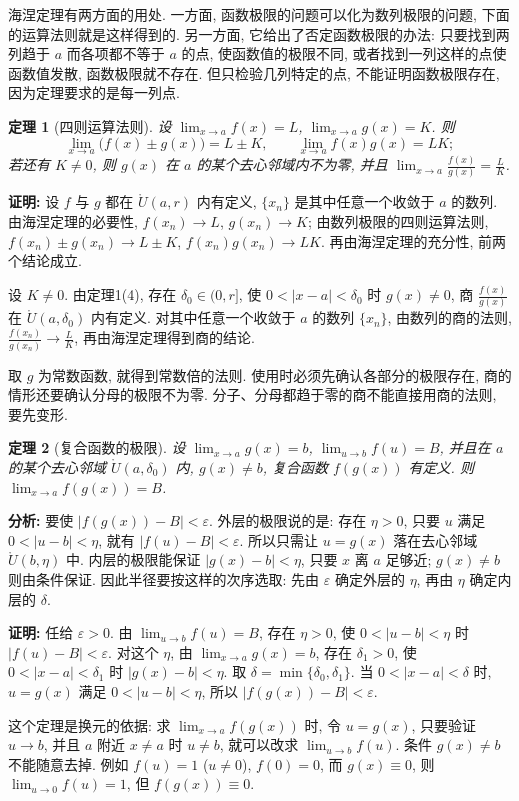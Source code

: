 \documentclass[UTF8,openany]{ctexbook}
\theoremstyle{chinesetextbook}
\newtheorem{theorem}{定理}[section]
\newenvironment{cnproof}{\par\indent\textbf{证明:} \ignorespaces}{\par}
\begin{document}
海涅定理有两方面的用处. 一方面, 函数极限的问题可以化为数列极限的问题, 下面的运算法则就是这样得到的. 另一方面, 它给出了否定函数极限的办法: 只要找到两列趋于 $a$ 而各项都不等于 $a$ 的点, 使函数值的极限不同, 或者找到一列这样的点使函数值发散, 函数极限就不存在. 但只检验几列特定的点, 不能证明函数极限存在, 因为定理要求的是每一列点.
\begin{theorem}[四则运算法则]
设 $\displaystyle\lim_{x\to a}f(x)=L$, $\displaystyle\lim_{x\to a}g(x)=K$. 则
\[
\lim_{x\to a}\bigl(f(x)\pm g(x)\bigr)=L\pm K,\qquad\lim_{x\to a}f(x)g(x)=LK;
\]
若还有 $K\ne0$, 则 $g(x)$ 在 $a$ 的某个去心邻域内不为零, 并且 $\displaystyle\lim_{x\to a}\frac{f(x)}{g(x)}=\frac LK$.
\end{theorem}
\begin{cnproof}
设 $f$ 与 $g$ 都在 $\mathring U(a,r)$ 内有定义, $\{x_n\}$ 是其中任意一个收敛于 $a$ 的数列. 由海涅定理的必要性, $f(x_n)\to L$, $g(x_n)\to K$; 由数列极限的四则运算法则, $f(x_n)\pm g(x_n)\to L\pm K$, $f(x_n)g(x_n)\to LK$. 再由海涅定理的充分性, 前两个结论成立.

设 $K\ne0$. 由定理1(4), 存在 $\delta_0\in(0,r]$, 使 $0<|x-a|<\delta_0$ 时 $g(x)\ne0$, 商 $\displaystyle\frac{f(x)}{g(x)}$ 在 $\mathring U(a,\delta_0)$ 内有定义. 对其中任意一个收敛于 $a$ 的数列 $\{x_n\}$, 由数列的商的法则, $\displaystyle\frac{f(x_n)}{g(x_n)}\to\frac LK$, 再由海涅定理得到商的结论.
\end{cnproof}
取 $g$ 为常数函数, 就得到常数倍的法则. 使用时必须先确认各部分的极限存在, 商的情形还要确认分母的极限不为零. 分子、分母都趋于零的商不能直接用商的法则, 要先变形.
\begin{theorem}[复合函数的极限]
设 $\displaystyle\lim_{x\to a}g(x)=b$, $\displaystyle\lim_{u\to b}f(u)=B$, 并且在 $a$ 的某个去心邻域 $\mathring U(a,\delta_0)$ 内, $g(x)\ne b$, 复合函数 $f(g(x))$ 有定义. 则 $\displaystyle\lim_{x\to a}f(g(x))=B$.
\end{theorem}
\par\indent\textbf{分析:} 要使 $|f(g(x))-B|<\varepsilon$. 外层的极限说的是: 存在 $\eta>0$, 只要 $u$ 满足 $0<|u-b|<\eta$, 就有 $|f(u)-B|<\varepsilon$. 所以只需让 $u=g(x)$ 落在去心邻域 $\mathring U(b,\eta)$ 中. 内层的极限能保证 $|g(x)-b|<\eta$, 只要 $x$ 离 $a$ 足够近; $g(x)\ne b$ 则由条件保证. 因此半径要按这样的次序选取: 先由 $\varepsilon$ 确定外层的 $\eta$, 再由 $\eta$ 确定内层的 $\delta$.
\begin{cnproof}
任给 $\varepsilon>0$. 由 $\displaystyle\lim_{u\to b}f(u)=B$, 存在 $\eta>0$, 使 $0<|u-b|<\eta$ 时 $|f(u)-B|<\varepsilon$. 对这个 $\eta$, 由 $\displaystyle\lim_{x\to a}g(x)=b$, 存在 $\delta_1>0$, 使 $0<|x-a|<\delta_1$ 时 $|g(x)-b|<\eta$. 取 $\delta=\min\{\delta_0,\delta_1\}$. 当 $0<|x-a|<\delta$ 时, $u=g(x)$ 满足 $0<|u-b|<\eta$, 所以 $|f(g(x))-B|<\varepsilon$.
\end{cnproof}
这个定理是换元的依据: 求 $\displaystyle\lim_{x\to a}f(g(x))$ 时, 令 $u=g(x)$, 只要验证 $u\to b$, 并且 $a$ 附近 $x\ne a$ 时 $u\ne b$, 就可以改求 $\displaystyle\lim_{u\to b}f(u)$. 条件 $g(x)\ne b$ 不能随意去掉. 例如 $f(u)=1$ ($u\ne0$), $f(0)=0$, 而 $g(x)\equiv0$, 则 $\displaystyle\lim_{u\to0}f(u)=1$, 但 $f(g(x))\equiv0$.
\end{document}
